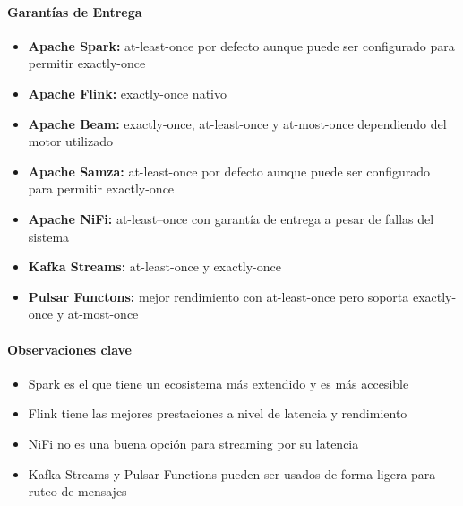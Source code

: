 \paragraph{Garantías de Entrega}
\begin{itemize}
    \item \textbf{Apache Spark:} at-least-once por defecto aunque puede ser configurado para permitir exactly-once
    \item \textbf{Apache Flink:} exactly-once nativo
    \item \textbf{Apache Beam:} exactly-once, at-least-once y at-most-once dependiendo del motor utilizado
    \item \textbf{Apache Samza:} at-least-once por defecto aunque puede ser configurado para permitir exactly-once
    \item \textbf{Apache NiFi:} at-least--once con garantía de entrega a pesar de fallas del sistema
    \item \textbf{Kafka Streams:} at-least-once y exactly-once
    \item \textbf{Pulsar Functons:} mejor rendimiento con at-least-once pero soporta exactly-once y at-most-once
\end{itemize}

\paragraph{Observaciones clave}
\begin{itemize}
    \item Spark es el que tiene un ecosistema más extendido y es más accesible
    \item Flink tiene las mejores prestaciones a nivel de latencia y rendimiento
    \item NiFi no es una buena opción para streaming por su latencia 
    \item Kafka Streams y Pulsar Functions pueden ser usados de forma ligera para ruteo de mensajes
\end{itemize}

\clearpage
\newpage

\setlength\cellspacetoplimit{4pt}
\setlength\cellspacebottomlimit{4pt}

